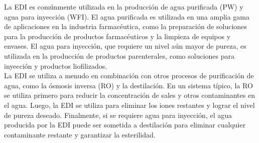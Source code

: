 La EDI es comúnmente utilizada en la producción de agua purificada (PW) y agua para inyección (WFI). El agua purificada es utilizada
en una amplia gama de aplicaciones en la industria farmacéutica, como la preparación de soluciones para la producción de productos
farmacéuticos y la limpieza de equipos y envases. El agua para inyección, que requiere un nivel aún mayor de pureza, es utilizada
en la producción de productos parenterales, como soluciones para inyección y productos liofilizados.\\

La EDI se utiliza a menudo en combinación con otros procesos de purificación de agua, como la ósmosis inversa (RO) y la destilación.
En un sistema típico, la RO se utiliza primero para reducir la concentración de sales y otros contaminantes en el agua. Luego, la EDI
se utiliza para eliminar los iones restantes y lograr el nivel de pureza deseado. Finalmente, si se requiere agua para inyección,
el agua producida por la EDI puede ser sometida a destilación para eliminar cualquier contaminante restante y garantizar la esterilidad.\\

